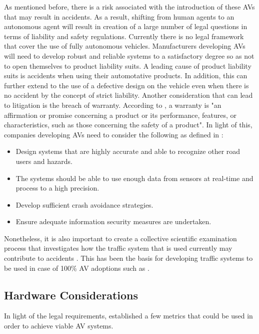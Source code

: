 As mentioned before, there is a risk associated with the introduction of these AVs that may result in accidents. As a result, shifting from human agents to an autonomous agent will result in creation of a large number of legal questions in terms of liability and safety regulations. Currently there is no legal framework that cover the use of fully autonomous vehicles. 
 Manufacturers developing AVs will need to develop robust and reliable systems to a satisfactory degree so as not to open themselves to product liability suits. A leading cause of product liability suits is accidents when using their automotative products. In addition, this can further extend to the use of a defective design on the vehicle even when there is no accident by the concept of strict liability. Another consideration that can lead to litigation is the breach of warranty. According to \cite{wu2015product}, a warranty is "an affirmation or promise concerning a product or its performance, features, or characteristics, such as those concerning the safety of a product". 
In light of this, companies developing AVs need to consider the following as defined in \cite{wu2015product}:
\begin{itemize}[noitemsep]
	\item Design systems  that are highly accurate and able to recognize other road users and hazards.
	\item The systems should be able to use enough data from sensors at real-time and process to a high precision. 
	\item Develop sufficient crash avoidance strategies. 
	\item Ensure adequate information security measures are undertaken.
\end{itemize}
Nonetheless, it is also important to create a collective scientific examination process that investigates how the traffic system that is used currently may contribute to accidents \cite{gasser2016fundamental}. This has  been the basis for developing traffic systems to be used in case of 100\%  AV adoptions such as \cite{tachet2016revisiting}. 


\subsection{Hardware Considerations}
In light of the legal requirements,  \cite{lin2018architectural} established a few metrics that could be used in order to achieve viable AV systems.
		
